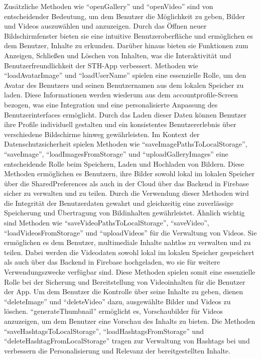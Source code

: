 Zusätzliche Methoden wie ``openGallery'' und ``openVideo'' sind von entscheidender Bedeutung, um dem Benutzer die Möglichkeit zu geben, Bilder und Videos auszuwählen und anzuzeigen. 
Durch das Öffnen neuer Bildschirmfenster bieten sie eine intuitive Benutzeroberfläche und ermöglichen es dem Benutzer, Inhalte zu erkunden. 
Darüber hinaus bieten sie Funktionen zum Anzeigen, Schließen und Löschen von Inhalten, was die Interaktivität und Benutzerfreundlichkeit der STH-App verbessert.
Methoden wie ``loadAvatarImage'' und ``loadUserName'' spielen eine essenzielle Rolle, um den Avatar des Benutzers und seinen Benutzernamen aus dem lokalen Speicher zu laden. 
Diese Informationen werden wiederum aus dem accountprofile-Screen bezogen, was eine Integration und eine personalisierte Anpassung des Benutzerinterfaces ermöglicht. 
Durch das Laden dieser Daten können Benutzer ihre Profile individuell gestalten und ein konsistentes Benutzererlebnis über verschiedene Bildschirme hinweg gewährleisten. 
Im Kontext der Datenschutzsicherheit spielen Methoden wie ``saveImagePathsToLocalStorage'', ``saveImage'', ``loadImagesFromStorage'' und ``uploadGalleryImages'' eine entscheidende Rolle beim Speichern, Laden und Hochladen von Bildern. 
Diese Methoden ermöglichen es Benutzern, ihre Bilder sowohl lokal im lokalen Speicher über die SharedPreferences als auch in der Cloud über das Backend in Firebase sicher zu verwalten und zu teilen. 
Durch die Verwendung dieser Methoden wird die Integrität der Benutzerdaten gewahrt und gleichzeitig eine zuverlässige Speicherung und Übertragung von Bildinhalten gewährleistet. 
Ähnlich wichtig sind Methoden wie ``saveVideoPathsToLocalStorage'', ``saveVideo'', ``loadVideosFromStorage'' und ``uploadVideos'' für die Verwaltung von Videos.
Sie ermöglichen es dem Benutzer, multimediale Inhalte nahtlos zu verwalten und zu teilen. Dabei werden die Videodaten sowohl lokal im lokalen Speicher gespeichert als auch über das Backend in Firebase hochgeladen, wo sie für weitere Verwendungszwecke verfügbar sind.
Diese Methoden spielen somit eine essenzielle Rolle bei der Sicherung und Bereitstellung von Videoinhalten für die Benutzer der App.
Um dem Benutzer die Kontrolle über seine Inhalte zu geben, dienen ``deleteImage'' und ``deleteVideo'' dazu, ausgewählte Bilder und Videos zu löschen. 
``generateThumbnail'' ermöglicht es, Vorschaubilder für Videos anzuzeigen, um dem Benutzer eine Vorschau des Inhalts zu bieten.
Die Methoden ``saveHashtagsToLocalStorage'', ``loadHashtagsFromStorage'' und ``deleteHashtagFromLocalStorage'' tragen zur Verwaltung von Hashtags bei und verbessern die Personalisierung und Relevanz der bereitgestellten Inhalte. 
